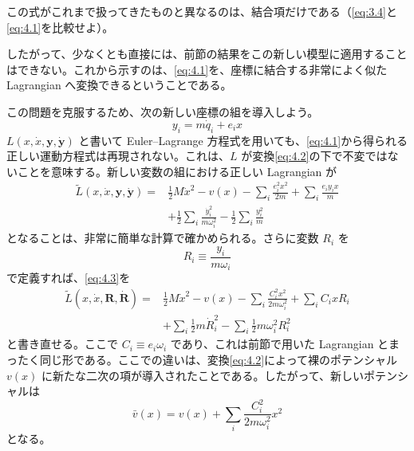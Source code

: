 この式がこれまで扱ってきたものと異なるのは、結合項だけである（\eqref{eq:3.4}と\eqref{eq:4.1}を比較せよ）。

したがって、少なくとも直接には、前節の結果をこの新しい模型に適用することはできない。これから示すのは、\eqref{eq:4.1}を、座標に結合する非常によく似た Lagrangian へ変換できるということである。

この問題を克服するため、次の新しい座標の組を導入しよう。
\begin{equation}
y_i=m\dot q_i+e_i x
\tag{4.2}\label{eq:4.2}
\end{equation}
$L(x,\dot x,\boldsymbol y,\dot{\boldsymbol y})$ と書いて Euler--Lagrange 方程式を用いても、\eqref{eq:4.1}から得られる正しい運動方程式は再現されない。これは、$L$ が変換\eqref{eq:4.2}の下で不変ではないことを意味する。新しい変数の組における正しい Lagrangian が
\begin{equation}
\begin{aligned}
\widetilde L(x,\dot x,\boldsymbol y,\dot{\boldsymbol y})
={}&\tfrac12 M\dot x^2-v(x)-\sum_i\frac{e_i^2x^2}{2m}
+\sum_i\frac{e_i y_i x}{m}\\
&+\tfrac12\sum_i\frac{\dot y_i^2}{m\omega_i^2}
-\tfrac12\sum_i\frac{y_i^2}{m}
\end{aligned}
\tag{4.3}\label{eq:4.3}
\end{equation}
となることは、非常に簡単な計算で確かめられる。さらに変数 $R_i$ を
\begin{equation}
R_i\equiv\frac{y_i}{m\omega_i}
\tag{4.4}\label{eq:4.4}
\end{equation}
で定義すれば、\eqref{eq:4.3}を
\begin{equation}
\begin{aligned}
\widetilde L(x,\dot x,\boldsymbol R,\dot{\boldsymbol R})
={}&\tfrac12 M\dot x^2-v(x)-\sum_i\frac{C_i^2x^2}{2m\omega_i^2}
+\sum_i C_i xR_i\\
&+\sum_i\tfrac12 m\dot R_i^2-\sum_i\tfrac12 m\omega_i^2R_i^2
\end{aligned}
\tag{4.5}\label{eq:4.5}
\end{equation}
と書き直せる。ここで $C_i\equiv e_i\omega_i$ であり、これは前節で用いた Lagrangian とまったく同じ形である。ここでの違いは、変換\eqref{eq:4.2}によって裸のポテンシャル $v(x)$ に新たな二次の項が導入されたことである。したがって、新しいポテンシャルは
\begin{equation}
\bar v(x)=v(x)+\sum_i\frac{C_i^2}{2m\omega_i^2}x^2
\tag{4.6}\label{eq:4.6}
\end{equation}
となる。

